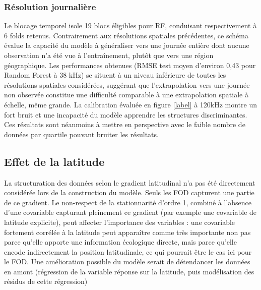 \subsubsection{Résolution journalière}
Le blocage temporel isole 19 blocs éligibles pour RF, conduisant respectivement à 6 folds retenus. Contrairement aux résolutions spatiales précédentes, ce schéma évalue la capacité du modèle à généraliser vers une journée entière dont aucune observation n'a été vue à l'entraînement, plutôt que vers une région géographique. 
Les performances obtenues (RMSE test moyen d'environ 0,43 pour Random Forest à 38 kHz) se situent à un niveau inférieure de toutes les résolutions spatiales considérées, suggérant que l'extrapolation vers une journée non observée constitue une difficulté comparable à une extrapolation spatiale à échelle, même grande.
La calibration évaluée en figure \ref{label} à 120kHz montre un fort bruit et une incapacité du modèle apprendre les structures discriminantes. Ces résultats sont néanmoins à mettre en perspective avec le faible nombre de données par quartile pouvant bruiter les résultats.  


\subsection{Effet de la latitude} 
\label{annexe:lat_effect}
La structuration des données selon le gradient latitudinal n'a pas été directement considérée lors de la construction du modèle. Seuls les FOD capturent une partie de ce gradient. Le non-respect de la stationnarité d'ordre 1, combiné à l'absence d'une covariable capturant pleinement ce gradient (par exemple une covariable de latitude explicite), peut affecter l'importance des variables : une covariable fortement corrélée à la latitude peut apparaître comme très importante non pas parce qu'elle apporte une information écologique directe, mais parce qu'elle encode indirectement la position latitudinale, ce qui pourrait être le cas ici pour le FOD. Une amélioration possible du modèle serait de détendancer les données en amont (régression de la variable réponse sur la latitude, puis modélisation des résidus de cette régression)

